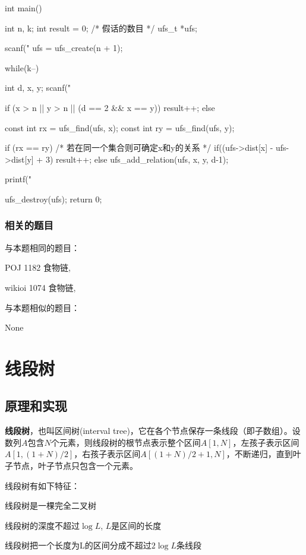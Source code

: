\begin{Codex}[label=food_chain.c]
int main() {
    int n, k;
    int result = 0; /* 假话的数目 */
    ufs_t *ufs;

    scanf("%
    ufs = ufs_create(n + 1);

    while(k--) {
        int d, x, y;
        scanf("%

        if (x > n || y > n || (d == 2 && x == y)) {
            result++;
        } else {
            const int rx = ufs_find(ufs, x);
            const int ry = ufs_find(ufs, y);

            if (rx == ry) { /* 若在同一个集合则可确定x和y的关系 */
                if((ufs->dist[x] - ufs->dist[y] + 3) %
                    result++;
            } else {
                ufs_add_relation(ufs, x, y, d-1);
            }
        }
    }

    printf("%

    ufs_destroy(ufs);
    return 0;
}
\end{Codex}

\subsubsection{相关的题目}
与本题相同的题目：
\begindot
\item POJ 1182 食物链, 
\item wikioi 1074 食物链, 
\myenddot

与本题相似的题目：
\begindot
\item  None
\myenddot


\section{线段树} %

\subsection{原理和实现}
\textbf{线段树}，也叫区间树(interval tree)，它在各个节点保存一条线段（即子数组）。设数列$A$包含$N$个元素，则线段树的根节点表示整个区间$A[1,N]$，左孩子表示区间$A[1, (1+N)/2]$，右孩子表示区间$A[(1+N)/2+1, N]$，不断递归，直到叶子节点，叶子节点只包含一个元素。

线段树有如下特征：
\begindot
\item 线段树是一棵完全二叉树
\item 线段树的深度不超过$\log L$, $L$是区间的长度
\item 线段树把一个长度为L的区间分成不超过$2\log L$条线段
\myenddot

